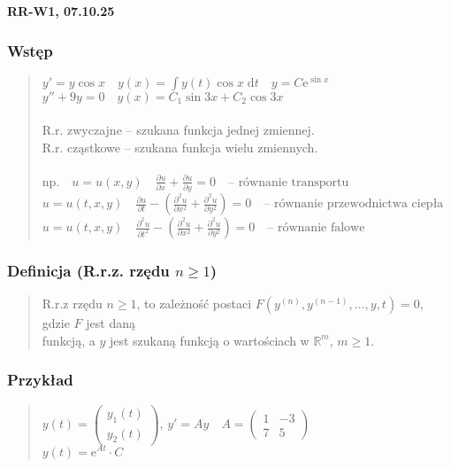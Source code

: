 \documentclass[10pt,a4paper]{article}
\newcommand{\zagadnienie}[3]{%
    \clearpage %
    \noindent\textbf{#1} #2\\
    #3
}
\begin{document}
\zagadnienie{RR-W1, 07.10.25}{}
{
\subsubsection*{Wstęp}
\begin{quote}
$y'=y\cos x\quad y(x)=\int y(t)\cos x\; \mathrm{d}t \quad y=C\mathrm{e}^{\sin x}$\\
$y''+9y=0 \quad y(x)=C_1\sin 3x+C_2\cos 3x$\\\\
R.r. zwyczajne – szukana funkcja jednej zmiennej.\\
R.r. cząstkowe – szukana funkcja wielu zmiennych.\\\\
$\mathrm{np.}\quad u=u(x,y)\quad \frac{\partial u}{\partial x}+\frac{\partial u}{\partial y}=0 \quad \text{– równanie transportu}$\\
$u=u(t,x,y)\quad \frac{\partial u}{\partial t}-\left(\frac{\partial^2 u}{\partial x^2}+\frac{\partial^2 u}{\partial y^2}\right)=0 \quad \text{– równanie przewodnictwa ciepła}$\\
$u=u(t,x,y)\quad \frac{\partial^2 u}{\partial t^2}-\left(\frac{\partial^2 u}{\partial x^2}+\frac{\partial^2 u}{\partial y^2}\right)=0 \quad \text{– równanie falowe}$
\end{quote}

\subsubsection*{Definicja (R.r.z. rzędu $n \ge 1$)}
\begin{quote}
R.r.z rzędu $n \ge 1$, to zależność postaci
$F\left(y^{(n)}, y^{(n-1)}, \dots, y, t\right)=0$, gdzie $F$ jest daną\\
funkcją, a $y$ jest szukaną funkcją o
wartościach w $\mathbb{R}^m$, $m \ge 1$.
\end{quote}

\subsubsection*{Przykład}
\begin{quote}
$y(t)=\begin{pmatrix} y_1(t) \\ y_2(t) \end{pmatrix}$, $y'=Ay \quad A=\begin{pmatrix} 1 & -3 \\ 7 & 5 \end{pmatrix}$\\
$y(t)=\mathrm{e}^{At}\cdot C$
\end{quote}

}
\end{document}
